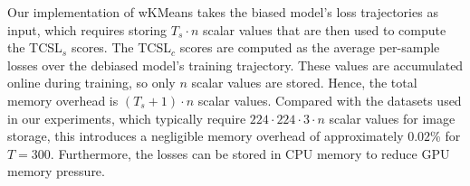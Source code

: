 \documentclass[letter,11pt]{article}
\begin{document}
Our implementation of wKMeans takes the biased model's loss trajectories as input, which requires storing $T_s \cdot n$ scalar values that are then used to compute the TCSL$_s$ scores. The TCSL$_c$ scores are computed as the average per-sample losses over the debiased model's training trajectory. These values are accumulated online during training, so only $n$ scalar values are stored. Hence, the total memory overhead is $(T_s + 1) \cdot n$ scalar values. Compared with the datasets used in our experiments, which typically require $224 \cdot 224 \cdot 3 \cdot n$ scalar values for image storage, this introduces a negligible memory overhead of approximately $0.02$\% for $T=300$. Furthermore, the losses can be stored in CPU memory to reduce GPU memory pressure.

\end{document}
